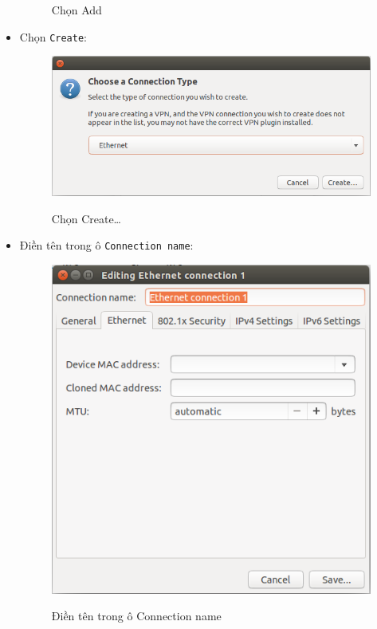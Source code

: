 \begin{itemize}
\begin{figure}[!h]
\begin{center}
\end{center}
\caption{Chọn \textsf{Add}}
\end{figure}
\newpage
\item Chọn \verb|Create|:
\begin{figure}[!h]
\begin{center}
{\includegraphics[scale=.4]{network/images/share-wifi-3}}
\end{center}
\caption{Chọn \textsf{Create\ldots}}
\end{figure}
\item Điền tên trong ô \verb|Connection name|:
\begin{figure}[!h]
\begin{center}
{\includegraphics[scale=.4]{network/images/share-wifi-4}}
\caption{Điền tên trong ô \textsf{Connection name}}

\end{center}
\end{figure}
\end{itemize}
